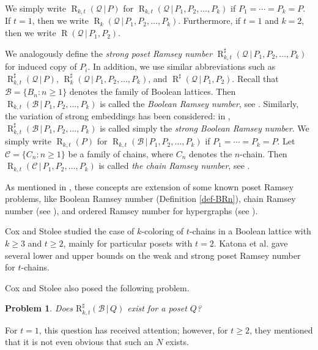 \documentclass[twoside,12pt]{article}
\newtheorem{problem}[theorem]{Problem}
\begin{document}
We simply write $\operatorname{R}_{k,t}(\mathcal{Q}\,|\,P)$ for $\operatorname{R}_{k,t}(\mathcal{Q}\,|\,P_1,P_2,\ldots,P_k)$ if $P_1=\cdots=P_k=P$.
If $t=1$, then we write $\operatorname{R}_{k}(\mathcal{Q}\,|\,P_1,P_2,\ldots,P_k)$. Furthermore, if $t=1$ and $k=2$, then we write $\operatorname{R}(\mathcal{Q}\,|\,P_1,P_2)$.

We analogously define the \emph{strong poset Ramsey number} $\operatorname{R}_{k,t}^{\sharp}(\mathcal{Q}\,|\,P_1,P_2,\ldots,P_k)$ for induced copy of $P_i$.
In addition,
we use similar abbreviations such as
$\operatorname{R}_{k,t}^{\sharp}(\mathcal{Q}\,|\,P)$,
$\operatorname{R}_{k}^{\sharp}(\mathcal{Q}\,|\,P_1, P_2, \dots , P_k)$,
and
$\operatorname{R}^{\sharp}(\mathcal{Q}\,|\,P_1, P_2)$.
Recall that $\mathcal{B}=\{B_{n} : n\geq 1\}$ denotes
the family of Boolean lattices.
Then
$\operatorname{R}_{k,t}(\mathcal{B}\,|\,P_1,P_2,\ldots,P_k)$
is called the \emph{Boolean Ramsey number}, see \cite{CS18}.
Similarly,
the variation of strong embeddings has been considered:
in \cite{AW17, LT22},
$\operatorname{R}_{k,t}^{\sharp}(\mathcal{B}\,|\,P_1,P_2,\ldots,P_k)$
is called simply
the \emph{strong Boolean Ramsey number}. We simply write $\operatorname{R}_{k,t}(P)$ for $\operatorname{R}_{k,t}(\mathcal{B}\,|\,P_1,P_2,\ldots,P_k)$ if $P_1=\cdots=P_k=P$.
Let $\mathcal{C}=\{C_{n} : n\geq 1\}$ be a
family of chains,
where $C_n$ denotes the $n$-chain.
Then
$\operatorname{R}_{k,t}(\mathcal{C}\,|\,P_1,P_2,\ldots,P_k)$
is called \emph{the chain Ramsey number},
see
\cite{CS18}.

As mentioned in \cite{KMOW25},
these concepts are extension of some known poset Ramsey problems, like
Boolean Ramsey number (Definition \ref{def-BRn}), chain Ramsey number (see
\cite{CS18}), and ordered Ramsey number for hypergraphs (see \cite{BJV19, CFLS17}).

Cox and Stolee \cite[Section 3]{CS18}
studied the case of $k$-coloring of $t$-chains in a Boolean lattice
with $k \geq 3$ and $t \geq 2$,
mainly for particular posets with $t = 2$. Katona et al. \cite{KMOW25} gave several lower and upper bounds on
the weak and strong poset Ramsey number for $t$-chains.

Cox and Stolee \cite[Section 6]{CS18} also posed the following problem.
\begin{problem}\label{prob1}
Does $\mathrm{R}_{k,t}^{\sharp}(\mathcal{B}\,|\,Q)$ exist for a poset $Q$?
\end{problem}

For $t=1$, this question has received attention; however, for $t\geq 2$, they mentioned that it is not even obvious that such an $N$ exists.
\end{document}
